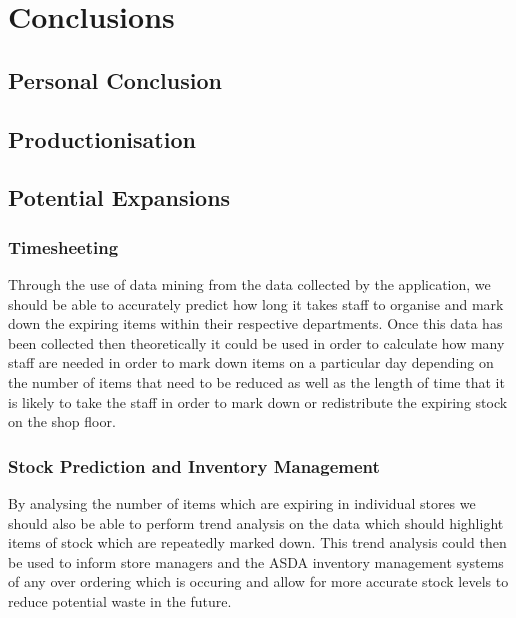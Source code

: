 \documentclass[a4paper,11pt]{report}
\begin{document}
\chapter{Conclusions}
\section{Personal Conclusion}
\section{Productionisation}

\section{Potential Expansions}

\subsection{Timesheeting}
Through the use of data mining from the data collected by the application, we should be able to accurately predict
how long it takes staff to organise and mark down the expiring items within their respective departments. Once 
this data has been collected then theoretically it could be used in order to calculate how many staff are needed 
in order to mark down items on a particular day depending on the number of items that need to be reduced as well 
as the length of time that it is likely to take the staff in order to mark down or redistribute the expiring stock
on the shop floor. 

\subsection{Stock Prediction and Inventory Management}

By analysing the number of items which are expiring in individual stores we should also be able to perform trend 
analysis on the data which should highlight items of stock which are repeatedly marked down. This trend analysis 
could then be used to inform store managers and the ASDA inventory management systems of any over ordering which is 
occuring and allow for more accurate stock levels to reduce potential waste in the future.
\end{document}
